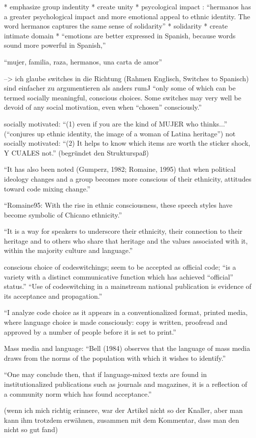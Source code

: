 * emphasize group indentity
* create unity
* psycological impact : ``hermanos has a greater psychological
impact and more emotional appeal to ethnic identity. The word hermanos captures the
same sense of solidarity''
* solidarity
* create intimate domain
* ``emotions are better expressed in Spanish, because words sound more
powerful in Spanish,''

``mujer, familia, raza, hermanos, una carta de amor''

--> ich glaube switches in die Richtung (Rahmen Englisch, Switches to Spanisch) sind einfacher zu argumentieren als anders rum^^

``only some of which can be termed socially meaningful,
conscious choices. Some switches may very well be devoid of any social motivation,
even when “chosen” consciously.''

socially motivated: ``(1) even if you are the kind of MUJER who thinks...'' (``conjures up ethnic identity, the image of a woman of Latina heritage'')
not socially motivated: ``(2) It helps to know which items are worth the sticker shock, Y CUALES not.'' (begründet den Strukturspaß)

``It has also been noted (Gumperz, 1982; Romaine, 1995) that when political ideology
changes and a group becomes more conscious of their ethnicity, attitudes toward code
mixing change.''

``Romaine95: With the rise in ethnic
consciousness, these speech styles have become symbolic of Chicano ethnicity.''

``It is a way for speakers to underscore their ethnicity,
their connection to their heritage and to others who share that heritage and the values
associated with it, within the majority culture and language.''

conscious choice of codeswitchings;
seem to be accepted as official code; ``is a variety with a distinct communicative function which
has achieved “official” status.''
``Use of codeswitching in a mainstream national publication is evidence of its
acceptance and propagation.''

``I analyze code choice as it appears in a conventionalized format, printed media,
where language choice is made consciously: copy is written, proofread and approved
by a number of people before it is set to print.''

Mass media and language: ``Bell (1984) observes that the language of mass media draws from the norms of
the population with which it wishes to identify.''

``One may conclude then, that if language-mixed
texts are found in institutionalized publications such as journals and magazines, it is a
reflection of a community norm which has found acceptance.''


(wenn ich mich richtig erinnere, war der Artikel nicht so der Knaller, aber man kann ihm trotzdem erwähnen, zusammen mit dem Kommentar, dass man den nicht so gut fand)
